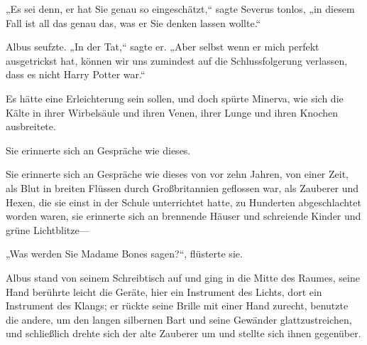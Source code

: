 „Es sei denn, er hat Sie genau so eingeschätzt,“ sagte Severus tonlos, „in diesem Fall ist all das genau das, was er Sie denken lassen wollte.“

Albus seufzte. „In der Tat,“ sagte er. „Aber selbst wenn er mich perfekt ausgetrickst hat, können wir uns zumindest auf die Schlussfolgerung verlassen, dass es nicht Harry Potter war.“

Es hätte eine Erleichterung sein sollen, und doch spürte Minerva, wie sich die Kälte in ihrer Wirbelsäule und ihren Venen, ihrer Lunge und ihren Knochen ausbreitete.

Sie erinnerte sich an Gespräche wie dieses.

Sie erinnerte sich an Gespräche wie dieses von vor zehn Jahren, von einer Zeit, als Blut in breiten Flüssen durch Großbritannien geflossen war, als Zauberer und Hexen, die sie einst in der Schule unterrichtet hatte, zu Hunderten abgeschlachtet worden waren, sie erinnerte sich an brennende Häuser und schreiende Kinder und grüne Lichtblitze—

„Was werden Sie Madame Bones sagen?“, flüsterte sie.

Albus stand von seinem Schreibtisch auf und ging in die Mitte des Raumes, seine Hand berührte leicht die Geräte, hier ein Instrument des Lichts, dort ein Instrument des Klangs; er rückte seine Brille mit einer Hand zurecht, benutzte die andere, um den langen silbernen Bart und seine Gewänder glattzustreichen, und schließlich drehte sich der alte Zauberer um und stellte sich ihnen gegenüber.

